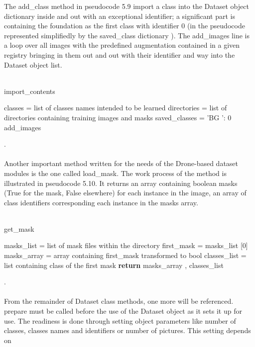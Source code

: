 The add\_class method in pseudocode 5.9 import a class into the Dataset object dictionary  inside and out with an exceptional identifier; a significant part is containing 
the foundation as the first class with identifier 0 (in the pseudocode represented simplifiedly by the saved\_class dictionary ). The add\_images line is a loop over all 
images with the predefined augmentation contained in a given registry bringing in them out and out with their identifier and way into the Dataset object list.
\\
\\
\begin{algorithm}[H]
  \caption{import\_contents}
  \SetAlgoLined
  \DontPrintSemicolon
   classes = list of classes names intended to be learned\;
  directories = list of directories containing training images and
  masks\;
  saved\_classes = {’BG ’: 0}\;
   {add\_images\;}
\end{algorithm}
.\\
\\ 
Another important method written for the needs of the Drone-based dataset modules is
the one called load\_mask. The work process of the method is illustrated in pseudocode
5.10. It returns an array containing boolean masks (True for the mask, False elsewhere)
for each instance in the image, an array of class identifiers corresponding each instance in the masks array.
\\
\\
\begin{algorithm}[H]
  \caption{get\_mask}
  \SetAlgoLined
  \DontPrintSemicolon
masks\_list = list of mask files within the directory\;
first\_mask = masks\_list [0]\;
masks\_array = array containing first\_mask transformed to bool\;
classes\_list = list containing class of the first mask\;
\textbf{return} masks\_array , classes\_list\; 
\end{algorithm}
.\\
\\
From the remainder of Dataset class methods, one more will be referenced. prepare must be called before the use of the Dataset object as it sets it up for use. 
The readiness is done through setting object parameters like number of classes, classes names and identifiers or number of pictures. This setting depends on 
